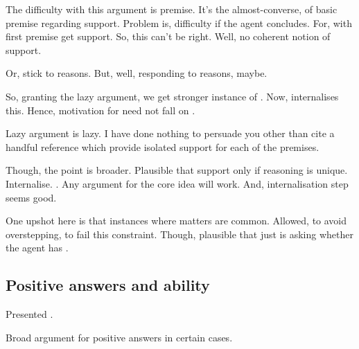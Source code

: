 \begin{note}
  The difficulty with this argument is premise.
  It's the almost-converse, of basic premise regarding support.
  Problem is, difficulty if the agent concludes.
  For, with first premise get support.
  So, this can't be right.
  Well, no coherent notion of support.

  Or, stick to reasons.
  But, well, responding to reasons, maybe.
\end{note}

\begin{note}
  So, granting the lazy argument, we get stronger instance of \zS{}.
  Now, \qzS{} internalises this.
  Hence, motivation for \qzS{} need not fall on \scen{}.

  Lazy argument is lazy.
  I have done nothing to persuade you other than cite a handful reference which provide isolated support for each of the premises.

  Though, the point is broader.
  Plausible that support only if reasoning is unique.
  Internalise.
  \qzS{}.
  Any argument for the core idea will work.
  And, internalisation step seems good.
\end{note}

\begin{note}
  One upshot here is that instances where \qzS{} matters are common.
  Allowed, to avoid overstepping, \support{} to fail this constraint.
  Though, plausible that \qzS{} just is asking whether the agent has \support{}.
\end{note}

\subsection{Positive answers and ability}
\label{sec:posit-answ-abil}

\begin{note}
  Presented .

  Broad argument for positive answers in certain cases.
\end{note}

